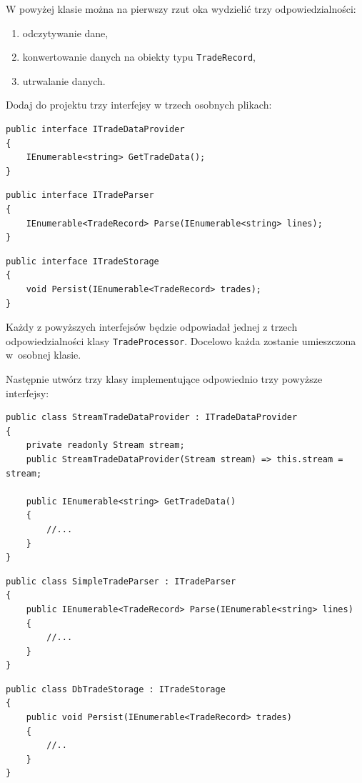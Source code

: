 W powyżej klasie można na pierwszy rzut oka wydzielić trzy odpowiedzialności:
\begin{enumerate}
	\item odczytywanie dane,
	\item konwertowanie danych na obiekty typu \texttt{TradeRecord},
	\item utrwalanie danych.
\end{enumerate}

Dodaj do projektu trzy interfejsy w trzech osobnych plikach:
\begin{lstlisting}
public interface ITradeDataProvider
{
	IEnumerable<string> GetTradeData();
}
\end{lstlisting}
\begin{lstlisting}
public interface ITradeParser
{
	IEnumerable<TradeRecord> Parse(IEnumerable<string> lines);
}
\end{lstlisting}
\begin{lstlisting}
public interface ITradeStorage
{
	void Persist(IEnumerable<TradeRecord> trades);
}
\end{lstlisting}
Każdy z powyższych interfejsów będzie odpowiadał jednej z trzech odpowiedzialności klasy \texttt{TradeProcessor}. Docelowo każda zostanie umieszczona w~osobnej klasie.

Następnie utwórz trzy klasy implementujące odpowiednio trzy powyższe interfejsy:
\begin{lstlisting}
public class StreamTradeDataProvider : ITradeDataProvider
{
	private readonly Stream stream;
	public StreamTradeDataProvider(Stream stream) => this.stream = stream;
	
	public IEnumerable<string> GetTradeData()
	{
		//...
	}
}
\end{lstlisting}
\begin{lstlisting}
public class SimpleTradeParser : ITradeParser
{	
	public IEnumerable<TradeRecord> Parse(IEnumerable<string> lines)
	{
		//...
	}
}
\end{lstlisting}
\begin{lstlisting}
public class DbTradeStorage : ITradeStorage
{	
	public void Persist(IEnumerable<TradeRecord> trades)
	{
		//..
	}
}
\end{lstlisting}

